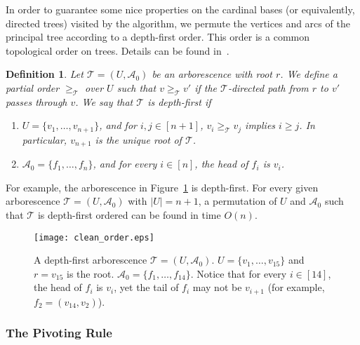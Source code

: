 \documentclass[11pt]{article}
\newtheorem{definition}[theorem]{Definition}
\begin{document}
In order to guarantee some nice properties on the cardinal bases (or equivalently, directed trees) visited by the algorithm, we permute the vertices and arcs of the principal tree according to a depth-first order. This order is a common topological order on trees. Details can be found in~\cite{cormen2022introduction}. \begin{definition}\label{def:depth-first}
    Let $\mathcal{T}=(U,\mathcal{A}_0)$ be an arborescence with root $r$. We define a partial order $\ge_\mathcal{T}$ over $U$ such that $v\ge_\mathcal{T} v'$ if the $\mathcal{T}$-directed path from $r$ to $v'$ passes through $v$. We say that $\mathcal{T}$ is \emph{depth-first} if
   \begin{enumerate}
    \item $U=\{v_1,\dots,v_{n+1}\}$, and for $i,j\in [n+1]$, $v_i\ge_\mathcal{T} v_j$ implies $i\ge j$. In particular, $v_{n+1}$ is the unique root of $\mathcal{T}$.
    \item $\mathcal{A}_0=\{f_1,\dots,f_n\}$, and for every $i\in [n]$, the head of $f_i$ is $v_i$.
   \end{enumerate}\end{definition}
For example, the arborescence in Figure~\ref{fig:clean_order} is depth-first. For every given arborescence $\mathcal{T}=(U,\mathcal{A}_0)$ with $|U|=n+1$, a permutation of $U$ and $\mathcal{A}_0$ such that $\mathcal{T}$ is depth-first ordered can be found in time $O(n)$. \begin{figure}[h!]
    \centering
    \texttt{[image: clean\_order.eps]}
    \caption{A depth-first arborescence $\mathcal{T}=(U,\mathcal{A}_0)$. $U=\{v_1,\dots,v_{15}\}$ and $r=v_{15}$ is the root. $\mathcal{A}_0=\{f_1,\dots,f_{14}\}$. Notice that for every $i\in[14]$, the head of $f_i$ is $v_i$, yet the tail of $f_i$ may not be $v_{i+1}$ (for example, $f_2=(v_{14},v_2)$).}
    \label{fig:clean_order}
\end{figure}


















\subsubsection{The Pivoting Rule}\label{sec:FFL}
\end{document}
